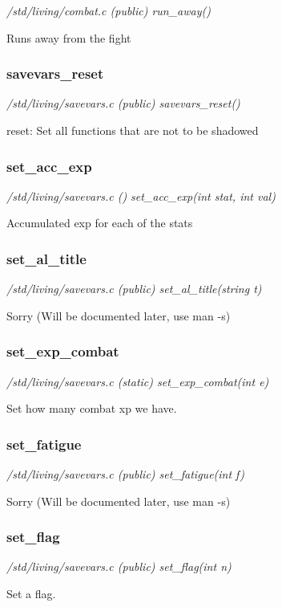 {\em /std/living/combat.c (public) run\_away()}

Runs away from the fight


\subsubsection{savevars\_reset}

{\em /std/living/savevars.c (public) savevars\_reset()}

reset: Set all functions that are not to be shadowed


\subsubsection{set\_acc\_exp}

{\em /std/living/savevars.c () set\_acc\_exp(int stat, int val)}

Accumulated exp for each of the stats


\subsubsection{set\_al\_title}

{\em /std/living/savevars.c (public) set\_al\_title(string t)}

Sorry (Will be documented later, use man -s)


\subsubsection{set\_exp\_combat}

{\em /std/living/savevars.c (static) set\_exp\_combat(int e)}

Set how many combat xp we have.


\subsubsection{set\_fatigue}

{\em /std/living/savevars.c (public) set\_fatigue(int f)}

Sorry (Will be documented later, use man -s)


\subsubsection{set\_flag}

{\em /std/living/savevars.c (public) set\_flag(int n)}

Set a flag.

